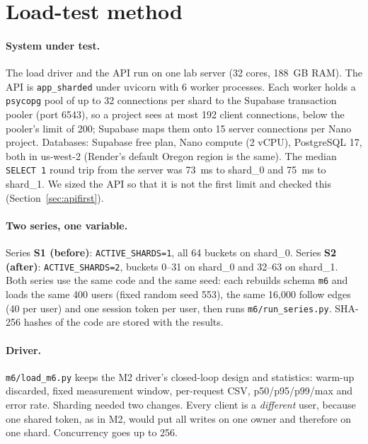 \section{Load-test method}\label{sec:method}

\paragraph{System under test.} The load driver and the API run on one lab server (32 cores, 188~GB RAM). The API
is \texttt{app\_sharded} under uvicorn with 6 worker processes. Each worker holds a \texttt{psycopg} pool of up to
32 connections per shard to the Supabase transaction pooler (port 6543), so a project sees at most 192 client
connections, below the pooler's limit of 200; Supabase maps them onto 15 server connections per Nano project.
Databases: Supabase free plan, Nano compute (2 vCPU), PostgreSQL 17, both in us-west-2 (Render's default Oregon region
is the same). The median \texttt{SELECT 1} round trip from the server was 73~ms to shard\_0 and 75~ms to shard\_1. We
sized the API so that it is not the first limit and checked this (Section~\ref{sec:apifirst}).

\paragraph{Two series, one variable.} Series \textbf{S1 (before)}: \texttt{ACTIVE\_SHARDS=1}, all 64 buckets on
shard\_0. Series \textbf{S2 (after)}: \texttt{ACTIVE\_SHARDS=2}, buckets 0--31 on shard\_0 and 32--63 on shard\_1.
Both series use the same code and the same seed: each rebuilds schema \texttt{m6} and loads the same 400 users
(fixed random seed 553), the same 16{,}000 follow edges (40 per user) and one session token per user, then runs
\texttt{m6/run\_series.py}. SHA-256 hashes of the code are stored with the results.

\paragraph{Driver.} \texttt{m6/load\_m6.py} keeps the M2 driver's closed-loop design and statistics: warm-up
discarded, fixed measurement window, per-request CSV, p50/p95/p99/max and error rate. Sharding needed two changes.
Every client is a \emph{different} user, because one shared token, as in M2, would put all writes on one owner and
therefore on one shard. Concurrency goes up to 256.

